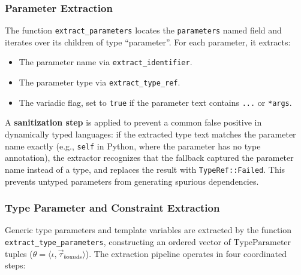 \subsubsection{Parameter Extraction}

The function \texttt{extract\_parameters} locates the
\texttt{parameters} named field and iterates over its children of
type ``parameter''. For each parameter, it extracts:
\begin{itemize}
  \item The parameter name via \texttt{extract\_identifier}.
  \item The parameter type via \texttt{extract\_type\_ref}.
  \item The variadic flag, set to \texttt{true} if the parameter text
    contains \texttt{...} or \texttt{*args}.
\end{itemize}

A \textbf{sanitization step} is applied to prevent a common false
positive in dynamically typed languages: if the extracted type text
matches the parameter name exactly (e.g., \texttt{self} in Python,
where the parameter has no type annotation), the extractor recognizes
that the fallback captured the parameter name instead of a type, and
replaces the result with \texttt{TypeRef::Failed}. This prevents
untyped parameters from generating spurious dependencies.

\subsubsection{Type Parameter and Constraint Extraction}

Generic type parameters and template variables are extracted by the function
\texttt{extract\_type\_parameters}, constructing an ordered vector of
$\text{TypeParameter}$ tuples ($\theta = \langle \iota,
\vec{\tau}_{bounds} \rangle$).
The extraction pipeline operates in four coordinated steps:

